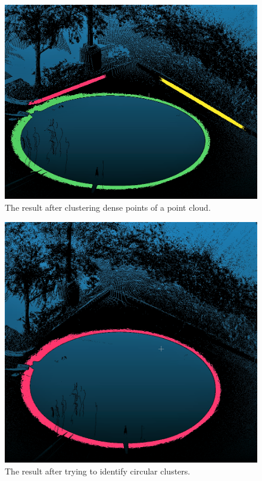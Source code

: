 \begin{figure}
  \centering
  \includegraphics[scale=0.5]{img/cluster.png}
  \caption{The result after clustering dense points of a point cloud.}
  \label{fig:cluster}
\end{figure}

\begin{figure}
  \centering
  \includegraphics[scale=0.5]{img/circular.png}
  \caption{The result after trying to identify circular clusters.}
  \label{fig:circular}
\end{figure}

